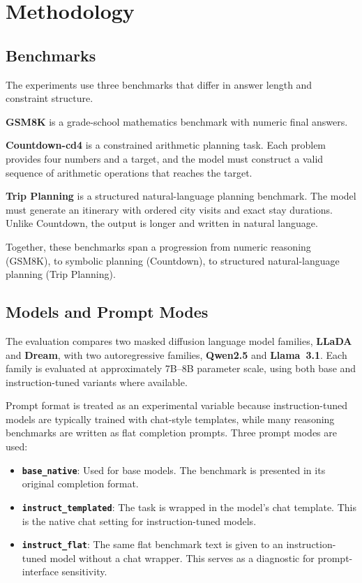 \section{Methodology}
\label{sec:methodology}

\subsection{Benchmarks}

The experiments use three benchmarks that differ in answer length and constraint structure.

\textbf{GSM8K} is a grade-school mathematics benchmark with numeric final answers.

\textbf{Countdown-cd4} is a constrained arithmetic planning task. Each problem provides four numbers and a target, and the model must construct a valid sequence of arithmetic operations that reaches the target.

\textbf{Trip Planning} is a structured natural-language planning benchmark. The model must generate an itinerary with ordered city visits and exact stay durations. Unlike Countdown, the output is longer and written in natural language.

Together, these benchmarks span a progression from numeric reasoning (GSM8K), to symbolic planning (Countdown), to structured natural-language planning (Trip Planning).

\subsection{Models and Prompt Modes}

The evaluation compares two masked diffusion language model families, \textbf{LLaDA} and \textbf{Dream}, with two autoregressive families, \textbf{Qwen2.5} and \textbf{Llama~3.1}. Each family is evaluated at approximately 7B--8B parameter scale, using both base and instruction-tuned variants where available.

Prompt format is treated as an experimental variable because instruction-tuned models are typically trained with chat-style templates, while many reasoning benchmarks are written as flat completion prompts. Three prompt modes are used:

\begin{itemize}
    \item \textbf{\texttt{base\_native}}: Used for base models. The benchmark is presented in its original completion format.
    \item \textbf{\texttt{instruct\_templated}}: The task is wrapped in the model's chat template. This is the native chat setting for instruction-tuned models.
    \item \textbf{\texttt{instruct\_flat}}: The same flat benchmark text is given to an instruction-tuned model without a chat wrapper. This serves as a diagnostic for prompt-interface sensitivity.
\end{itemize}

